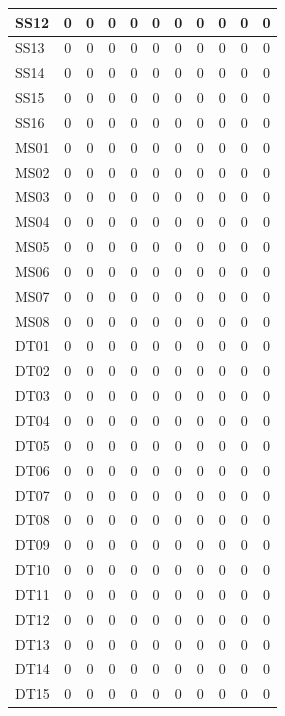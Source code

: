 \documentclass [10pt]{article}
\begin{document}
\begin{longtable}{ | p{} | c | c | c | c | c | c | c | c | c | c | }
	SS12 & 0 & 0 & 0 & 0 & 0 & 0 & 0 & 0 & 0 & 0 \\ \hline
	SS13 & 0 & 0 & 0 & 0 & 0 & 0 & 0 & 0 & 0 & 0 \\ \hline
	SS14 & 0 & 0 & 0 & 0 & 0 & 0 & 0 & 0 & 0 & 0 \\ \hline
	SS15 & 0 & 0 & 0 & 0 & 0 & 0 & 0 & 0 & 0 & 0 \\ \hline
	SS16 & 0 & 0 & 0 & 0 & 0 & 0 & 0 & 0 & 0 & 0 \\ \hline
	MS01 & 0 & 0 & 0 & 0 & 0 & 0 & 0 & 0 & 0 & 0 \\ \hline
	MS02 & 0 & 0 & 0 & 0 & 0 & 0 & 0 & 0 & 0 & 0 \\ \hline
	MS03 & 0 & 0 & 0 & 0 & 0 & 0 & 0 & 0 & 0 & 0 \\ \hline
	MS04 & 0 & 0 & 0 & 0 & 0 & 0 & 0 & 0 & 0 & 0 \\ \hline
	MS05 & 0 & 0 & 0 & 0 & 0 & 0 & 0 & 0 & 0 & 0 \\ \hline
	MS06 & 0 & 0 & 0 & 0 & 0 & 0 & 0 & 0 & 0 & 0 \\ \hline
	MS07 & 0 & 0 & 0 & 0 & 0 & 0 & 0 & 0 & 0 & 0 \\ \hline
	MS08 & 0 & 0 & 0 & 0 & 0 & 0 & 0 & 0 & 0 & 0 \\ \hline
	DT01 & 0 & 0 & 0 & 0 & 0 & 0 & 0 & 0 & 0 & 0 \\ \hline
	DT02 & 0 & 0 & 0 & 0 & 0 & 0 & 0 & 0 & 0 & 0 \\ \hline
	DT03 & 0 & 0 & 0 & 0 & 0 & 0 & 0 & 0 & 0 & 0 \\ \hline
	DT04 & 0 & 0 & 0 & 0 & 0 & 0 & 0 & 0 & 0 & 0 \\ \hline
	DT05 & 0 & 0 & 0 & 0 & 0 & 0 & 0 & 0 & 0 & 0 \\ \hline
	DT06 & 0 & 0 & 0 & 0 & 0 & 0 & 0 & 0 & 0 & 0 \\ \hline
	DT07 & 0 & 0 & 0 & 0 & 0 & 0 & 0 & 0 & 0 & 0 \\ \hline
	DT08 & 0 & 0 & 0 & 0 & 0 & 0 & 0 & 0 & 0 & 0 \\ \hline
	DT09 & 0 & 0 & 0 & 0 & 0 & 0 & 0 & 0 & 0 & 0 \\ \hline
	DT10 & 0 & 0 & 0 & 0 & 0 & 0 & 0 & 0 & 0 & 0 \\ \hline
	DT11 & 0 & 0 & 0 & 0 & 0 & 0 & 0 & 0 & 0 & 0 \\ \hline
	DT12 & 0 & 0 & 0 & 0 & 0 & 0 & 0 & 0 & 0 & 0 \\ \hline
	DT13 & 0 & 0 & 0 & 0 & 0 & 0 & 0 & 0 & 0 & 0 \\ \hline
	DT14 & 0 & 0 & 0 & 0 & 0 & 0 & 0 & 0 & 0 & 0 \\ \hline
	DT15 & 0 & 0 & 0 & 0 & 0 & 0 & 0 & 0 & 0 & 0 \\ \hline

\end{longtable}
\end{document}
